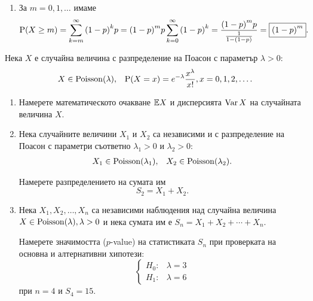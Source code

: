 \documentclass[numbers=endperiod, DIV=15, bibliography=totocnumbered]{scrartcl}
\begin{document}
\begin{solution}
\begin{enumerate}[label=\alph*)]
    \item За $m = 0, 1, \ldots$ имаме
    \begin{displaymath}
      \operatorname{P}(X \geq m)
      =
      \sum_{k=m}^\infty {(1-p)}^k p
      =
      {(1-p)}^m p \sum_{k=0}^\infty {(1-p)}^k
      =
      \frac {{(1-p)}^m p} {\frac 1 {1-(1-p)}}
      =
      \boxed{{(1-p)}^m}.
    \end{displaymath}
  \end{enumerate}
\end{solution}

\begin{exercise}\label{ex:se-summer2016}
  Нека $X$ е случайна величина с разпределение на Поасон с параметър $\lambda > 0$:
  \begin{align*}
    X \in \operatorname{Poisson}(\lambda),
    &&
    \operatorname{P}(X = x) = e^{-\lambda} \frac {x^\lambda} {x!}, x = 0, 1, 2, \ldots.
  \end{align*}

  \begin{enumerate}[label=\alph*)]
    \item Намерете математическото очакване $\mathbb{E} X$ и дисперсията $\operatorname{Var} X$ на случайната величина $X$.
    \item Нека случайните величини $X_1$ и $X_2$ са независими и с разпределение на Поасон с параметри съответно $\lambda_1 > 0$ и $\lambda_2 > 0$:
    \begin{align*}
      X_1 \in \operatorname{Poisson}(\lambda_1),
      &&
      X_2 \in \operatorname{Poisson}(\lambda_2).
    \end{align*}

    Намерете разпределението на сумата им
    \begin{displaymath}
      S_2 = X_1 + X_2.
    \end{displaymath}

    \item Нека $X_1, X_2, \ldots, X_n$ са независими наблюдения над случайна величина $X \in \operatorname{Poisson}(\lambda), \lambda > 0$ и нека сумата им е $S_n = X_1 + X_2 + \cdots + X_n$.

    Намерете значимостта ($p$-value) на статистиката $S_n$ при проверката на основна и алтернативни хипотези:
    \begin{displaymath}
      \begin{cases}
        H_0: &\lambda = 3 \\
        H_1: &\lambda = 6
      \end{cases}
    \end{displaymath}
    при $n = 4$ и $S_4 = 15$.
  \end{enumerate}
\end{exercise}
\end{document}
